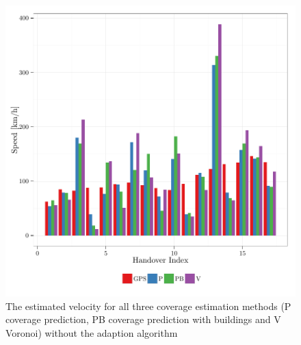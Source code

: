\documentclass[twocolumn]{bmcart}%
\begin{document}
\begin{backmatter}
\begin{figure}[h!]
\label{fig:velocity}
  \caption{ The estimated velocity for all three coverage estimation methods (P coverage prediction, PB coverage prediction with buildings and V Voronoi) without the adaption algorithm
      }
      \includegraphics[width=0.9\columnwidth]{images/563_SpeedWithoutAdaption}
\end{figure}


\end{backmatter}
\end{document}
